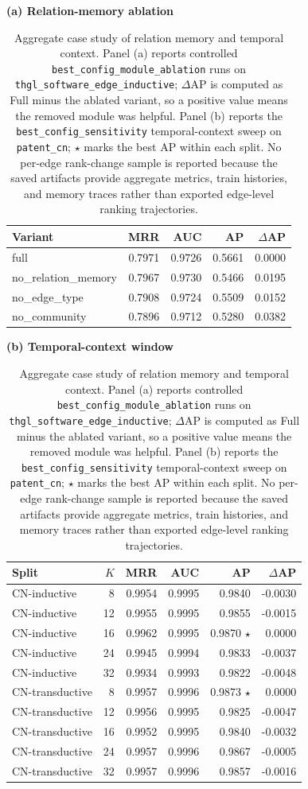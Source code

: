 \begin{table}[t]
\centering
\caption{Aggregate case study of relation memory and temporal context. Panel (a) reports controlled \texttt{best\_config\_module\_ablation} runs on \texttt{thgl\_software\_edge\_inductive}; $\Delta$AP is computed as Full minus the ablated variant, so a positive value means the removed module was helpful. Panel (b) reports the \texttt{best\_config\_sensitivity} temporal-context sweep on \texttt{patent\_cn}; $\star$ marks the best AP within each split. No per-edge rank-change sample is reported because the saved artifacts provide aggregate metrics, train histories, and memory traces rather than exported edge-level ranking trajectories.}
\label{tab:case-relation-temporal-context}
\centering
\small
\textbf{(a) Relation-memory ablation}\vspace{2pt}
\begin{tabular}{lrrrr}
\toprule
Variant & MRR & AUC & AP & $\Delta$AP \\
\midrule
full & 0.7971 & 0.9726 & 0.5661 & 0.0000 \\
no\_relation\_memory & 0.7967 & 0.9730 & 0.5466 & 0.0195 \\
no\_edge\_type & 0.7908 & 0.9724 & 0.5509 & 0.0152 \\
no\_community & 0.7896 & 0.9712 & 0.5280 & 0.0382 \\
\bottomrule
\end{tabular}

\vspace{6pt}
\centering
\small
\textbf{(b) Temporal-context window}\vspace{2pt}
\begin{tabular}{lrrrrr}
\toprule
Split & $K$ & MRR & AUC & AP & $\Delta$AP \\
\midrule
CN-inductive & 8 & 0.9954 & 0.9995 & 0.9840 & -0.0030 \\
CN-inductive & 12 & 0.9955 & 0.9995 & 0.9855 & -0.0015 \\
CN-inductive & 16 & 0.9962 & 0.9995 & 0.9870 $\star$ & 0.0000 \\
CN-inductive & 24 & 0.9945 & 0.9994 & 0.9833 & -0.0037 \\
CN-inductive & 32 & 0.9934 & 0.9993 & 0.9822 & -0.0048 \\
CN-transductive & 8 & 0.9957 & 0.9996 & 0.9873 $\star$ & 0.0000 \\
CN-transductive & 12 & 0.9956 & 0.9995 & 0.9825 & -0.0047 \\
CN-transductive & 16 & 0.9952 & 0.9995 & 0.9840 & -0.0032 \\
CN-transductive & 24 & 0.9957 & 0.9996 & 0.9867 & -0.0005 \\
CN-transductive & 32 & 0.9957 & 0.9996 & 0.9857 & -0.0016 \\
\bottomrule
\end{tabular}
\end{table}
